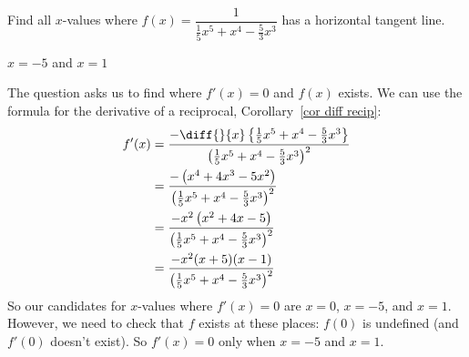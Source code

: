 \begin{Mquestion} Find all $x$-values where $f(x)=\dfrac{1}{\frac{1}{5}x^5+x^4-\frac{5}{3}x^3}$ has a horizontal tangent line.
\end{Mquestion}
\begin{answer} $x=-5$ and $x=1$
\end{answer}
\begin{solution}
The question asks us to find where $f'(x)=0$ and $f(x)$ exists. We can use the formula for the derivative of a reciprocal, Corollary~\ref*{cor diff recip}:
\begin{align*}
f'(x) &= \frac{-\diff{}{x}\left\{\frac{1}{5}x^5+x^4-\frac{5}{3}x^3\right\}}{\left(\frac{1}{5}x^5+x^4-\frac{5}{3}x^3\right)^2}\\
&=\frac{-\left(x^4+4x^3-{5}x^2\right)}{\left(\frac{1}{5}x^5+x^4-\frac{5}{3}x^3\right)^2}\\
&=\frac{-x^2\left(x^2+4x-{5}\right)}{\left(\frac{1}{5}x^5+x^4-\frac{5}{3}x^3\right)^2}\\
&=\frac{-x^2(x+5)(x-1)}{\left(\frac{1}{5}x^5+x^4-\frac{5}{3}x^3\right)^2}
\end{align*}
So our candidates for $x$-values where $f'(x)=0$ are $x=0$, $x=-5$, and $x=1$. However, we need to check that $f$ exists at these places:  $f(0)$ is undefined (and  $f'(0)$ doesn't exist). So $f'(x)=0$ only when $x=-5$ and $x=1$.
\end{solution}

\subsection*{\Application}




